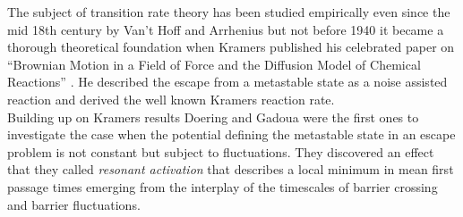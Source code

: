 The subject of transition rate theory has been studied empirically even since the mid 18th century by Van't Hoff \cite{hoff1884} and Arrhenius \cite{arrhenius1889} but not before 1940 it became a thorough theoretical foundation when Kramers published his celebrated paper on ``Brownian Motion in a Field of Force and the Diffusion Model of Chemical Reactions'' \cite{Kramers1940}.
He described the escape from a metastable state as a noise assisted reaction and derived the well known Kramers reaction rate.\\
Building up on Kramers results Doering and Gadoua \cite{Doering1992} were the first ones to investigate the case when the potential defining the metastable state in an escape problem is not constant but subject to fluctuations. They discovered an effect that they called \emph{resonant activation} that describes a local minimum in mean first passage times emerging from the interplay of the timescales of barrier crossing and barrier fluctuations. \\
